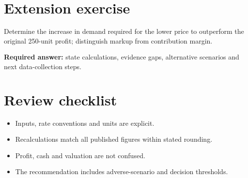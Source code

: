 \documentclass[11pt]{article}
\begin{document}
\section{Extension exercise}
Determine the increase in demand required for the lower price to outperform the original 250-unit profit; distinguish markup from contribution margin.\par\textbf{Required answer:} state calculations, evidence gaps, alternative scenarios and next data-collection steps.
\section{Review checklist}
\begin{itemize}[leftmargin=*,itemsep=3pt]
\item Inputs, rate conventions and units are explicit.
\item Recalculations match all published figures within stated rounding.
\item Profit, cash and valuation are not confused.
\item The recommendation includes adverse-scenario and decision thresholds.
\end{itemize}
\end{document}
